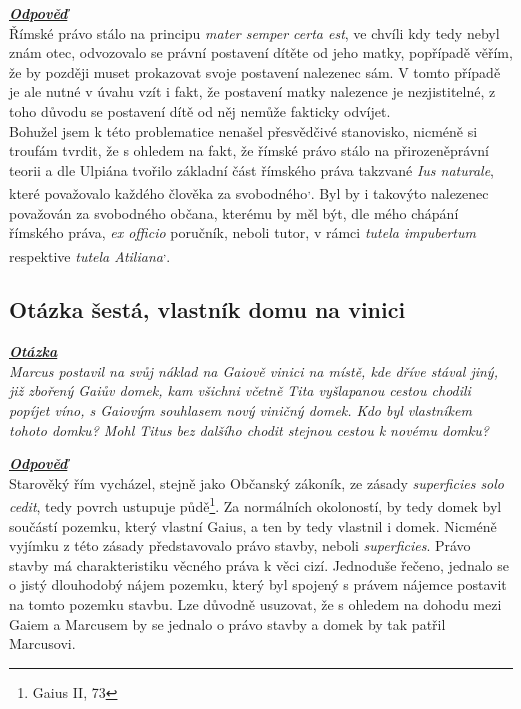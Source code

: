 \documentclass{article}
\begin{document}
\noindent\noindent\textbf{\textit{\underline{Odpověď}}}\\


Římské právo stálo na principu \textit{mater semper certa est}, ve chvíli kdy tedy nebyl znám otec, odvozovalo se právní postavení dítěte od jeho matky, popřípadě věřím, že by později muset prokazovat svoje postavení nalezenec sám. V tomto případě je ale nutné v úvahu vzít i fakt, že postavení matky nalezence je nezjistitelné, z toho důvodu se postavení dítě od něj nemůže fakticky odvíjet.\\

Bohužel jsem k této problematice nenašel přesvědčivé stanovisko, nicméně si troufám tvrdit, že s ohledem na fakt, že římské právo stálo na přirozeněprávní teorii a dle Ulpiána tvořilo základní část římského práva takzvané \textit{Ius naturale}, které považovalo každého člověka za svobodného\textsuperscript{,}. Byl by i takovýto nalezenec považován za svobodného občana, kterému by měl být, dle mého chápání římského práva, \textit{ex officio} poručník, neboli tutor, v rámci \textit{tutela impubertum} respektive \textit{tutela Atiliana}\textsuperscript{,}.

\subsection{Otázka šestá, vlastník domu na vinici}
\textbf{\textit{\underline{Otázka}}}\\
\textit{Marcus postavil na svůj náklad na Gaiově vinici na místě, kde dříve stával jiný, již zbořený Gaiův domek, kam všichni včetně Tita vyšlapanou cestou chodili popíjet víno, s Gaiovým souhlasem nový viničný domek. Kdo byl vlastníkem tohoto domku? Mohl Titus bez dalšího chodit stejnou cestou k novému domku?}\\

\newpage

\noindent\noindent\textbf{\textit{\underline{Odpověď}}}\\

Starověký řím vycházel, stejně jako Občanský zákoník, ze zásady \textit{superficies solo cedit}, tedy povrch ustupuje půdě\footnote{Gaius II, 73}. Za normálních okoloností, by tedy domek byl součástí pozemku, který vlastní Gaius, a ten by tedy vlastnil i domek. Nicméně vyjímku z této zásady představovalo právo stavby, neboli \textit{superficies}. Právo stavby má charakteristiku věcného práva k věci cizí. Jednoduše řečeno, jednalo se o jistý dlouhodobý nájem pozemku, který byl spojený s právem nájemce postavit na tomto pozemku stavbu. Lze důvodně usuzovat, že s ohledem na dohodu mezi Gaiem a Marcusem by se jednalo o právo stavby a domek by tak patřil Marcusovi.\\
\end{document}

